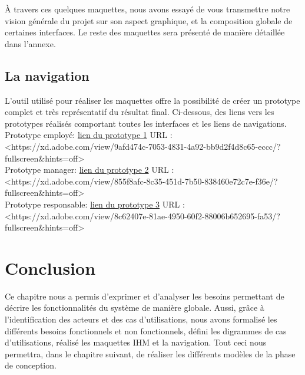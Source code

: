 \clearpage
À travers ces quelques maquettes, nous avons essayé de vous transmettre notre
vision générale du projet sur son aspect graphique, et la composition globale de
certaines interfaces. Le reste des maquettes sera présenté de manière détaillée
dans l’annexe.
        
\subsection{La navigation}
L’outil utilisé pour réaliser les maquettes offre la possibilité de créer un
prototype complet et très représentatif du résultat final. Ci-dessous, des liens
vers les prototypes réalisés comportant toutes les interfaces et les liens de
navigations.\\

Prototype employé: \href{https://xd.adobe.com/view/9afd474c-7053-4831-4a92-bb9d2f4d8c65-eccc/?fullscreen\&hints=off}{lien du prototype 1}
URL :<https://xd.adobe.com/view/9afd474c-7053-4831-4a92-bb9d2f4d8c65-eccc/?fullscreen\&hints=off>\\
Prototype manager: \href{https://xd.adobe.com/view/855f8afc-8c35-451d-7b50-838460e72c7e-f36e/?fullscreen\&hints=off}{lien du prototype 2}
URL :<https://xd.adobe.com/view/855f8afc-8c35-451d-7b50-838460e72c7e-f36e/?fullscreen\&hints=off>\\
Prototype responsable: \href{https://xd.adobe.com/view/8c62407e-81ae-4950-60f2-88006b652695-fa53/?fullscreen\&hints=off}{lien du prototype 3}
URL :<https://xd.adobe.com/view/8c62407e-81ae-4950-60f2-88006b652695-fa53/?fullscreen\&hints=off>

        
\section{Conclusion}
Ce chapitre nous a permis d’exprimer et d’analyser les besoins permettant de
décrire les fonctionnalités du système de manière globale. Aussi, grâce à
l’identification des acteurs et des cas d’utilisations, nous avons formalisé les
différents besoins fonctionnels et non fonctionnels, défini les digrammes de cas
d’utilisations, réalisé les maquettes IHM et la navigation. Tout ceci nous
permettra, dans le chapitre suivant, de réaliser les différents modèles de la
phase de conception.
